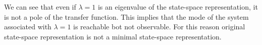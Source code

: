 \documentclass[twoside]{article}
\begin{document}
We can see that even if $\lambda = 1$ is an eigenvalue of the
state-space representation, it is not a pole of the transfer
function. This implies that the mode of the system associated 
with $\lambda = 1$ is reachable bot not observable. For this
reason original state-space representation is not a minimal
state-space representation. 

\end{document}
